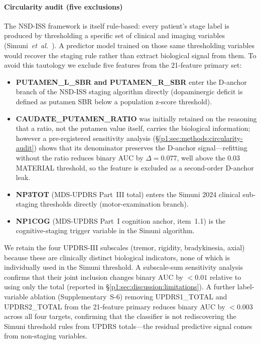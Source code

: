 \paragraph*{Circularity audit (five exclusions)}
\label{p1:sec:methods:circularity-audit}
The NSD-ISS framework is itself rule-based: every patient's stage label is produced by thresholding a specific set of clinical and imaging variables (Simuni~\textit{et~al.}~\cite{simuni2024}). A predictor model trained on those same thresholding variables would recover the staging rule rather than extract biological signal from them. To avoid this tautology we exclude five features from the 21-feature primary set:

\begin{itemize}[leftmargin=*,itemsep=1pt,topsep=3pt]
\item \textbf{PUTAMEN\_L\_SBR and PUTAMEN\_R\_SBR} enter the D-anchor branch of the NSD-ISS staging algorithm directly (dopaminergic deficit is defined as putamen SBR below a population z-score threshold).
\item \textbf{CAUDATE\_PUTAMEN\_RATIO} was initially retained on the reasoning that a ratio, not the putamen value itself, carries the biological information; however a pre-registered sensitivity analysis (\S\ref{p1:sec:methods:circularity-audit}) shows that its denominator preserves the D-anchor signal---refitting without the ratio reduces binary AUC by $\Delta{=}0.077$, well above the $0.03$ MATERIAL threshold, so the feature is excluded as a second-order D-anchor leak.
\item \textbf{NP3TOT} (MDS-UPDRS Part~III total) enters the Simuni 2024 clinical sub-staging thresholds directly (motor-examination branch).
\item \textbf{NP1COG} (MDS-UPDRS Part~I cognition anchor, item~1.1) is the cognitive-staging trigger variable in the Simuni algorithm.
\end{itemize}

We retain the four UPDRS-III subscales (tremor, rigidity, bradykinesia, axial) because these are clinically distinct biological indicators, none of which is individually used in the Simuni threshold. A subscale-sum sensitivity analysis confirms that their joint inclusion changes binary AUC by ${<}0.01$ relative to using only the total (reported in \S\ref{p1:sec:discussion:limitations}). A further label-variable ablation (Supplementary~S-6) removing UPDRS1\_TOTAL and UPDRS2\_TOTAL from the 21-feature primary reduces binary AUC by ${<}0.003$ across all four targets, confirming that the classifier is not rediscovering the Simuni threshold rules from UPDRS totals---the residual predictive signal comes from non-staging variables.

